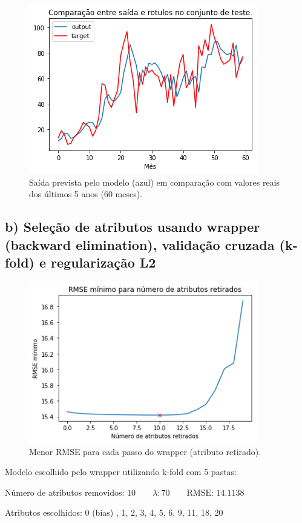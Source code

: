 \documentclass[a4paper, 12pt]{article}
\begin{document}
\begin{figure}[h!]
    \centering
    \includegraphics[width=10cm]{images/raw.png}
    \caption{Saída prevista pelo modelo (azul) em comparação com valores reais dos últimos 5 anos (60 meses).}
\end{figure}

\subsection*{b) Seleção de atributos usando wrapper (backward elimination), validação cruzada (k-fold) e regularização L2}

\begin{figure}[h!]
    \centering
    \includegraphics[width=10cm]{images/backward.png}
    \caption{Menor RMSE para cada passo do wrapper (atributo retirado).}
\end{figure}

Modelo escolhido pelo wrapper utilizando k-fold com 5 pastas:

Número de atributos removidos: $10 \quad\quad \lambda: 70 \quad\quad \text{RMSE: } 14.1138$

Atributos escolhidos: 0 (bias) , 1, 2, 3, 4, 5, 6, 9, 11, 18, 20
\end{document}
